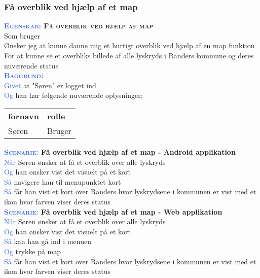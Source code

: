 \subsubsection{Få overblik ved hjælp af et map}
\textbf{\textsc{\textcolor{RoyalBlue}{Egenskab:} Få overblik ved hjælp af map}}\\
Som bruger\\
Ønsker jeg at kunne danne mig et hurtigt overblik ved hjælp af en map funktion\\
For at kunne se et overbliks billede af alle lyskryds i Randers kommune  og deres nuværende status\\

\textsc{\textcolor{RoyalBlue}{\textbf{Baggrund:}}}\\
\textcolor{RoyalBlue}{Givet} at "Søren" er logget ind\\
\textcolor{RoyalBlue}{Og} han har følgende nuværende oplysninger:\\
\begin{tabular}{| l | l |}
	\textbf{fornavn} & \textbf{rolle} \\
	Søren & Bruger\\
\end{tabular}
\newline \newline
\clearpage

\textbf{\textsc{\textcolor{RoyalBlue}{Scenarie:}} Få overblik ved hjælp af et map - Android applikation}\\
\textcolor{RoyalBlue}{Når} Søren ønsker at få et overblik over alle lyskryds\\
\textcolor{RoyalBlue}{Og} han ønsker vist det visuelt på et kort\\
\textcolor{RoyalBlue}{Så} navigere han til menupunktet kort\\
\textcolor{RoyalBlue}{Så} får han vist et kort over Randers hvor lyskrydsene i kommunen er vist med et ikon hvor farven viser deres status\\

\textbf{\textsc{\textcolor{RoyalBlue}{Scenarie:}} Få overblik ved hjælp af et map - Web applikation}\\
\textcolor{RoyalBlue}{Når} Søren ønsker at få et overblik over alle lyskryds\\
\textcolor{RoyalBlue}{Og} han ønsker vist det visuelt på et kort\\
\textcolor{RoyalBlue}{Så} kan han gå ind i menuen\\
\textcolor{RoyalBlue}{Og} trykke på map\\
\textcolor{RoyalBlue}{Så} får han vist et kort over Randers hvor lyskrydsene i kommunen er vist med et ikon hvor farven viser deres status\\

